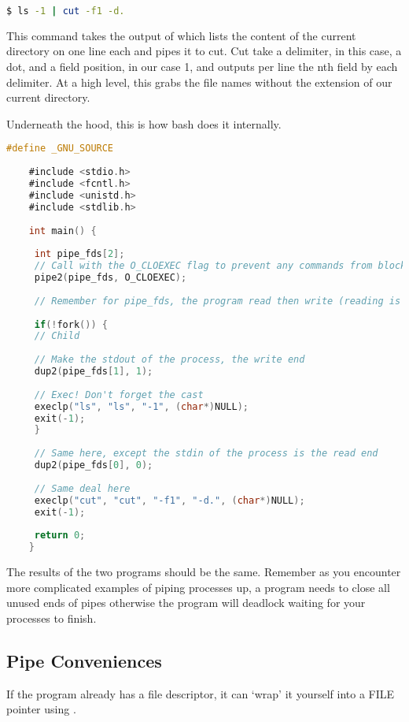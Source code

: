 \begin{lstlisting}[language=bash]
	$ ls -1 | cut -f1 -d.
\end{lstlisting}
	 
This command takes the output of  which lists the content of the current directory on one line each and pipes it to cut.
Cut take a delimiter, in this case, a dot, and a field position, in our case 1, and outputs per line the nth field by each delimiter.
At a high level, this grabs the file names without the extension of our current directory.
	 
Underneath the hood, this is how bash does it internally.
	 
\begin{lstlisting}[language=C]
	#define _GNU_SOURCE
	 
	#include <stdio.h>
	#include <fcntl.h>
	#include <unistd.h>
	#include <stdlib.h>
	 
	int main() {
	 
	 int pipe_fds[2];
	 // Call with the O_CLOEXEC flag to prevent any commands from blocking
	 pipe2(pipe_fds, O_CLOEXEC);
	 
	 // Remember for pipe_fds, the program read then write (reading is 0 and writing is 1)
	 
	 if(!fork()) {
	 // Child
	 
	 // Make the stdout of the process, the write end
	 dup2(pipe_fds[1], 1);
	 
	 // Exec! Don't forget the cast
	 execlp("ls", "ls", "-1", (char*)NULL);
	 exit(-1);
	 }
	 
	 // Same here, except the stdin of the process is the read end
	 dup2(pipe_fds[0], 0);
	 
	 // Same deal here
	 execlp("cut", "cut", "-f1", "-d.", (char*)NULL);
	 exit(-1);
	 
	 return 0;
	}
\end{lstlisting}
	 
The results of the two programs should be the same.
Remember as you encounter more complicated examples of piping processes up, a program needs to close all unused ends of pipes otherwise the program will deadlock waiting for your processes to finish.
	 
\subsection{Pipe Conveniences}
	 
If the program already has a file descriptor, it can `wrap' it yourself into a FILE pointer using .
	 
